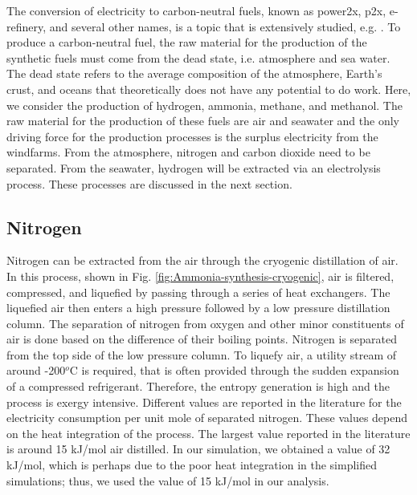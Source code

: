 \documentclass{ECOS_2021}
\begin{document}
The conversion of electricity to carbon-neutral fuels, known as power2x,
p2x, e-refinery, and several other names, is a topic that is extensively
studied, e.g. \cite{freiMethanolHydrogenCarrier2020b,barbarossaCO2ConversionCH42013,ghaibPowertoMethaneStateoftheartReview2018,guerraMethaneProductionCombined2018,koponenReviewWaterElectrolysis2015,mendoza-hernandezExergyValorizationWater2019}.
To produce a carbon-neutral fuel, the raw material for the production
of the synthetic fuels must come from the dead state, i.e. atmosphere
and sea water. The dead state refers to the average composition of
the atmosphere, Earth's crust, and oceans that theoretically does
not have any potential to do work. Here, we consider the production
of hydrogen, ammonia, methane, and methanol. The raw material for
the production of these fuels are air and seawater and the only driving
force for the production processes is the surplus electricity from
the windfarms. From the atmosphere, nitrogen and carbon dioxide need
to be separated. From the seawater, hydrogen will be extracted via
an electrolysis process. These processes are discussed in the next
section.

\subsection{Nitrogen}

Nitrogen can be extracted from the air through the cryogenic distillation
of air. In this process, shown in Fig. \ref{fig:Ammonia-synthesis-cryogenic},
air is filtered, compressed, and liquefied by passing through a series
of heat exchangers. The liquefied air then enters a high pressure
followed by a low pressure distillation column. The separation of
nitrogen from oxygen and other minor constituents of air is done based
on the difference of their boiling points. Nitrogen is separated from
the top side of the low pressure column. To liquefy air, a utility
stream of around -200$^{o}$C is required, that is often provided
through the sudden expansion of a compressed refrigerant. Therefore,
the entropy generation is high and the process is exergy intensive.
Different values are reported in the literature for the electricity
consumption per unit mole of separated nitrogen. These values depend
on the heat integration of the process. The largest value reported
in the literature is around 15 kJ/mol air distilled. In our simulation,
we obtained a value of 32 kJ/mol, which is perhaps due to the poor
heat integration in the simplified simulations; thus, we used the
value of 15 kJ/mol in our analysis.
\end{document}
